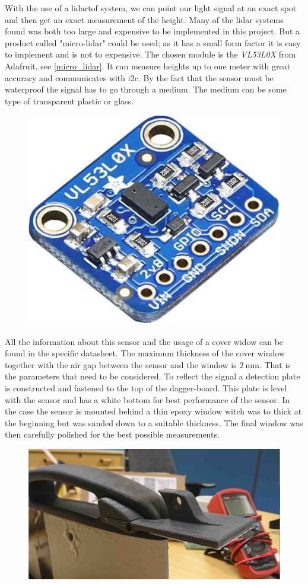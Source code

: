 With the use of a \gls{lidar}\gls{tof} system, we can point our light signal at an exact spot and then get an exact measurement of the height.  
Many of the \gls{lidar} systems found was both too large and expensive to be implemented in this project.
But a product called "micro-lidar" could be used; as it has a small form factor it is easy to implement and is not to expensive.
The chosen module is the \emph{VL53L0X} from Adafruit, see \autoref{micro_lidar}. It can measure heights up to one meter with great accuracy and communicates with \gls{i2c}.
By the fact that the sensor must be waterproof the signal has to go through a medium. The medium can be some type of transparent plastic or glass.
\begin{figure}[H]
	\centering
	\includegraphics[width = .45\textwidth]{Figures/Adafruit_height_sensor.jpg}
	\label{micro_lidar}
\end{figure}

All the information about this sensor and the usage of a cover widow can be found in the specific datasheet\cite{Tof_cover}. The maximum thickness of the cover window together with the air gap between the sensor and the window is $2~\textrm{mm}$. That is the parameters that need to be considered. To reflect the signal a detection plate is constructed and fastened to the top of the dagger-board. This plate is level with the sensor and has a white bottom for best performance of the sensor. In the case the sensor is mounted behind a thin epoxy window witch was to thick at the beginning but was sanded down to a suitable thickness. The final window was then carefully polished for the best possible measurements. 

\begin{figure}[H]
	\centering
	\includegraphics[width = .8\textwidth]{Figures/height_measure.jpg}
	\label{height_measure}
\end{figure}


